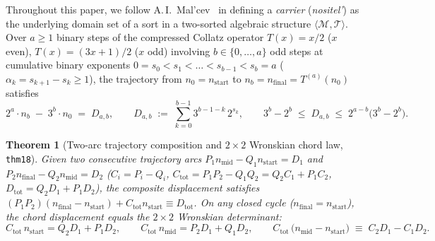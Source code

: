 \documentclass[11pt,a4paper]{article}
\newtheorem{theorem}{Theorem}[section]
\theoremstyle{definition}
\theoremstyle{remark}
\begin{document}
Throughout this paper, we follow A.\,I.~Mal'cev~\cite{Malcev1973} in defining a \emph{carrier} (\emph{nositel'}) as the underlying domain set of a sort in a two-sorted algebraic structure $\langle\mathcal{M},\mathcal{T}\rangle$. Over $a \ge 1$ binary steps of the compressed Collatz operator $T(x) = x/2$ ($x$ even), $T(x) = (3x+1)/2$ ($x$ odd) involving $b \in \{0,\dots,a\}$ odd steps at cumulative binary exponents $0 = s_0 < s_1 < \dots < s_{b-1} < s_b = a$ ($\alpha_k = s_{k+1} - s_k \ge 1$), the trajectory from $n_0 = n_{\mathrm{start}}$ to $n_b = n_{\mathrm{final}} = T^{(a)}(n_0)$ satisfies
\begin{equation}
  \label{eq:collatz-equation-of-motion}
  2^a \cdot n_b \;-\; 3^b \cdot n_0 \;=\; D_{a,b}, \qquad
  D_{a,b} \;:=\; \sum_{k=0}^{b-1} 3^{b-1-k}\,2^{s_k}, \qquad
  3^b - 2^b \;\le\; D_{a,b} \;\le\; 2^{a-b}\bigl(3^b - 2^b\bigr).
\end{equation}

\begin{theorem}[Two-arc trajectory composition and $2\times 2$ Wronskian chord law, \texttt{thm18}]
\label{thm:two-arc-wronskian}
Given two consecutive trajectory arcs $P_1 n_{\mathrm{mid}} - Q_1 n_{\mathrm{start}} = D_1$ and $P_2 n_{\mathrm{final}} - Q_2 n_{\mathrm{mid}} = D_2$ ($C_i = P_i - Q_i$, $C_{\mathrm{tot}} = P_1 P_2 - Q_1 Q_2 = Q_2 C_1 + P_1 C_2$, $D_{\mathrm{tot}} = Q_2 D_1 + P_1 D_2$), the composite displacement satisfies $(P_1 P_2)(n_{\mathrm{final}} - n_{\mathrm{start}}) + C_{\mathrm{tot}} n_{\mathrm{start}} \equiv D_{\mathrm{tot}}$. On any closed cycle ($n_{\mathrm{final}} = n_{\mathrm{start}}$), the chord displacement equals the $2\times 2$ Wronskian determinant:
\begin{equation}
  \label{eq:cycle-wronskian-chord}
  C_{\mathrm{tot}}\,n_{\mathrm{start}} = Q_2 D_1 + P_1 D_2, \qquad
  C_{\mathrm{tot}}\,n_{\mathrm{mid}} = P_2 D_1 + Q_1 D_2, \qquad
  C_{\mathrm{tot}}\,\bigl(n_{\mathrm{mid}} - n_{\mathrm{start}}\bigr) \;\equiv\; C_2 D_1 - C_1 D_2.
\end{equation}
\end{theorem}
\end{document}
